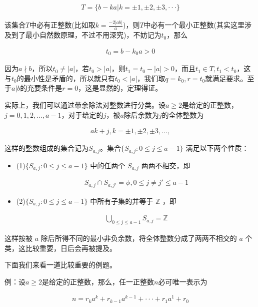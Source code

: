 \documentclass[12pt, a4paper, oneside]{ctexart}
\begin{document}
$$\begin{align*}
T=\{b-ka|k=\pm1,\pm2,\pm3,\cdot\cdot\cdot\}
\end{align*}$$

该集合$T$中必有正整数(比如取$k=\frac{-2|ab|}{a}$)，则$T$中必有一个最小正整数(其实这里涉及到了最小自然数原理，不过不用深究)，不妨记为$t_0$，那么

$$\begin{align*}
t_0=b-k_0a>0
\end{align*}$$

因为$a\nmid b$，所以$t_0\neq|a|$，若$t_0>|a|$，则$t_1=t_0-|a|>0$，而且$t_1\in T,t_1<t_0$，这与$t_0$的最小性是矛盾的，所以就只有$t_0<|a|$，我们取$q=k_0,r=t_0$就满足要求。至于$a|b$的充要条件是$r=0$，这是显然的，定理得证。

实际上，我们可以通过带余除法对整数进行分类。设$a\geqslant2$是给定的正整数，$j=0,1,2,...,a-1$，对于给定的$j$，被$a$除后余数为$j$的全体整数为

$$\begin{align*}
ak+j, k=\pm1,\pm2,\pm3,...,
\end{align*}$$

这样的整数组成的集合记为$S_{a,j}$。集合$\{S_{a,j}:0\leqslant j\leqslant a-1\}$ 满足以下两个性质：
\begin{itemize}
\item (1)$\{S_{a,j}:0\leqslant j\leqslant a-1\}$ 中的任两个 $S_{a,j}$ 两两不相交，即

$$\begin{align*}
S_{a,j}\cap S_{a,j'}=\phi,0\leqslant j\neq j'\leqslant a-1
\end{align*}$$

\item (2)$\{S_{a,j}:0\leqslant j\leqslant a-1\}$ 中所有子集的并等于 $\mathbb{Z}$ ，即

$$\begin{align*}
\bigcup_{0\leqslant j\leqslant a-1}S_{a,j}=\mathbb{Z}
\end{align*}$$
\end{itemize}
这样按被 $a$ 除后所得不同的最小非负余数，将全体整数分成了两两不相交的 $a$ 个类，这比较重要，日后会再被提及。

下面我们来看一道比较重要的例题。

例：设$a\geqslant2$是给定的正整数，那么，任一正整数$n$必可唯一表示为

$$\begin{align*}
n=r_ka^k+r_{k-1}a^{k-1}+\cdot\cdot\cdot+r_1a^1+r_0
\end{align*}$$
\end{document}
